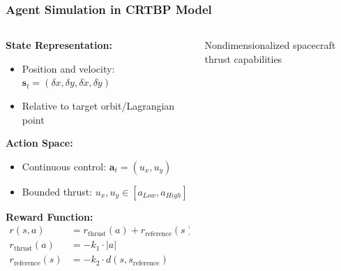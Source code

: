 \begin{frame}
  \frametitle{Agent Simulation in CRTBP Model}
  \begin{columns}[T]
    \begin{column}{0.5\textwidth}
      \textbf{State Representation:}
      \begin{itemize}
        \setlength{\itemsep}{-1pt}
        \item Position and velocity: $\boldsymbol{s}_t = (\delta x, \delta y, \delta \dot{x}, \delta \dot{y})$
        \item Relative to target orbit/Lagrangian point
      \end{itemize}
      
      \textbf{Action Space:}
      \begin{itemize}
        \setlength{\itemsep}{-1pt}
        \item Continuous control: $\boldsymbol{a}_t = (u_x, u_y)$
        \item Bounded thrust: $u_x, u_y \in [a_{Low}, a_{High}]$
      \end{itemize}

      \textbf{Reward Function:}
      \small
      \begin{align*}
        r(s, a) &= r_{\text{thrust}}(a) + r_{\text{reference}}(s) + r_{\text{terminal}}(s) \\[-1ex]
        r_{\text{thrust}}(a) &= -k_1 \cdot |a| \\[-1ex]
        r_{\text{reference}}(s) &= -k_2 \cdot d(s, s_{\text{reference}})
      \end{align*}
    \end{column}
    
    \begin{column}{0.5\textwidth}
      \vspace{-0.5cm}
      \begin{table}[h!]
        \scriptsize
        \centering
        \caption{\footnotesize Nondimensionalized spacecraft thrust capabilities}
        \label{tab:camparison}
    

\end{table}
\end{column}
\end{columns}
\end{frame}
